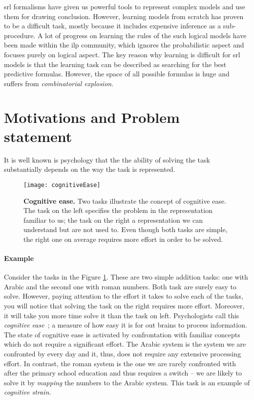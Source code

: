 \gls{srl} formalisms have given us powerful tools to represent complex models and use them for drawing conclusion.
However, learning models from scratch has proven to be a difficult task, mostly because it includes expensive inference as a sub-procedure.
A lot of progress on learning the rules of the such logical models have been made within the \gls{ilp} community, which ignores the probabilistic aspect and focuses purely on logical aspect.
The key reason why learning is difficult for \gls{srl} models is that the learning task can be described as searching for the best predictive formulas.
However, the space of all possible formulas is huge and suffers from \textit{combinatorial explosion}.










\section{Motivations and Problem statement}

It is well known is psychology that the the ability of solving the task substantially depends on the way the task is represented.


\begin{figure}
	\centering
	\texttt{[image: cognitiveEase]}
	\caption[Cognitive ease]{\textbf{Cognitive ease.} Two tasks illustrate the concept of cognitive ease. The task on the left specifies the problem in the representation familiar to us; the task on the right a representation we can understand but are not used to. Even though both tasks are simple, the right one on average requires more effort in order to be solved.}
	\label{fig:cogease}
\end{figure}

\paragraph{Example} Consider the tasks in the Figure \ref{fig:cogease}.
These are two simple addition tasks: one with Arabic and the second one with roman numbers.
Both task are surely easy to solve.
However, paying attention to the effort it takes to solve each of the tasks, you will notice that solving the task on the right requires more effort.
Moreover, it will take you more time solve it than the task on left.
Psychologists call this \textit{cognitive ease}~\cite{kahneman2011thinking}; a measure of how easy it is for out brains to process information.
The state of cognitive ease is activated by confrontation with familiar concepts which do not require a significant effort.
The Arabic system is the system we are confronted by every day and it, thus, does not require any extensive processing effort.
In contrast, the roman system is the one we are rarely confronted with after the primary school education and thus requires a switch -- we are likely to solve it by \textit{mapping} the numbers to the Arabic system.
This task is an example of \textit{cognitive strain}.









